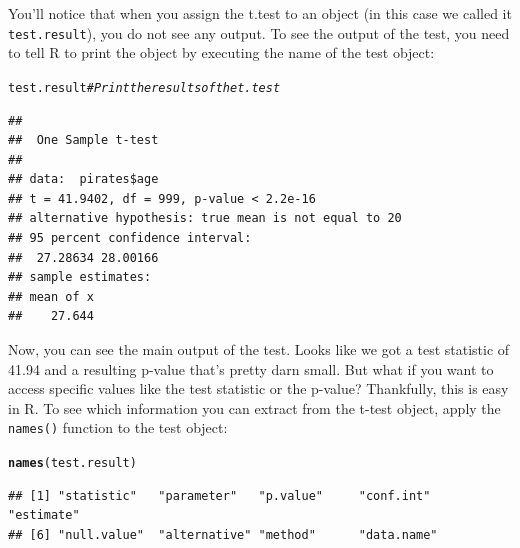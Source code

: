 \documentclass{tufte-book}\usepackage[]{graphicx}\usepackage[]{color}
\makeatletter
\newcommand{\hlcom}[1]{\textcolor[rgb]{0.678,0.584,0.686}{\textit{#1}}}%
\newcommand{\hlstd}[1]{\textcolor[rgb]{0.345,0.345,0.345}{#1}}%
\newcommand{\hlkwd}[1]{\textcolor[rgb]{0.737,0.353,0.396}{\textbf{#1}}}%
\newenvironment{kframe}{%
 \def\at@end@of@kframe{}%
 \ifinner\ifhmode%
  \def\at@end@of@kframe{\end{minipage}}%
  \begin{minipage}{\columnwidth}%
 \fi\fi%
 \def\FrameCommand##1{\hskip\@totalleftmargin \hskip-\fboxsep
 \colorbox{shadecolor}{##1}\hskip-\fboxsep
     \hskip-\linewidth \hskip-\@totalleftmargin \hskip\columnwidth}%
 \MakeFramed {\advance\hsize-\width
   \@totalleftmargin\z@ \linewidth\hsize
   \@setminipage}}%
 {\par\unskip\endMakeFramed%
 \at@end@of@kframe}
\newenvironment{knitrout}{}{} %
\makeatother
\begin{document}
\begin{footnotesize}
You'll notice that when you assign the t.test to an object (in this case we called it \texttt{test.result}), you do not see any output. To see the output of the test, you need to tell R to print the object by executing the name of the test object:

\begin{footnotesize}
\begin{knitrout}
\color{fgcolor}\begin{kframe}
\begin{alltt}
\hlstd{test.result}  \hlcom{# Print the results of the t.test}
\end{alltt}
\begin{verbatim}
## 
## 	One Sample t-test
## 
## data:  pirates$age
## t = 41.9402, df = 999, p-value < 2.2e-16
## alternative hypothesis: true mean is not equal to 20
## 95 percent confidence interval:
##  27.28634 28.00166
## sample estimates:
## mean of x 
##    27.644
\end{verbatim}
\end{kframe}
\end{knitrout}
\end{footnotesize}

Now, you can see the main output of the test. Looks like we got a test statistic of 41.94 and a resulting p-value that's pretty darn small. But what if you want to access specific values like the test statistic or the p-value? Thankfully, this is easy in R. To see which information you can extract from the t-test object, apply the \texttt{names()} function to the test object:


\begin{footnotesize}
\begin{knitrout}
\color{fgcolor}\begin{kframe}
\begin{alltt}
\hlkwd{names}\hlstd{(test.result)}
\end{alltt}
\begin{verbatim}
## [1] "statistic"   "parameter"   "p.value"     "conf.int"    "estimate"   
## [6] "null.value"  "alternative" "method"      "data.name"
\end{verbatim}
\end{kframe}
\end{knitrout}
\end{footnotesize}


\end{footnotesize}
\end{document}
